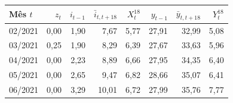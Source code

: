 \begin{tabular}{lrrrrrrr}
\toprule
Mês $t$ & $z_t$ & $i_{t-1}$ & $\bar{i}_{t,t+18}$ & $X^{18}_t$ & $y_{t-1}$ & $\bar{y}_{t,t+18}$ & $Y^{18}_t$ \\
\midrule
02/2021 & 0{,}00 & 1{,}90 & 7{,}67 & 5{,}77 & 27{,}91 & 32{,}99 & 5{,}08 \\
03/2021 & 0{,}25 & 1{,}90 & 8{,}29 & 6{,}39 & 27{,}67 & 33{,}63 & 5{,}96 \\
04/2021 & 0{,}00 & 2{,}23 & 8{,}89 & 6{,}66 & 27{,}95 & 34{,}35 & 6{,}40 \\
05/2021 & 0{,}00 & 2{,}65 & 9{,}47 & 6{,}82 & 28{,}66 & 35{,}07 & 6{,}41 \\
06/2021 & 0{,}00 & 3{,}29 & 10{,}01 & 6{,}72 & 27{,}99 & 35{,}76 & 7{,}77 \\
\bottomrule
\end{tabular}
